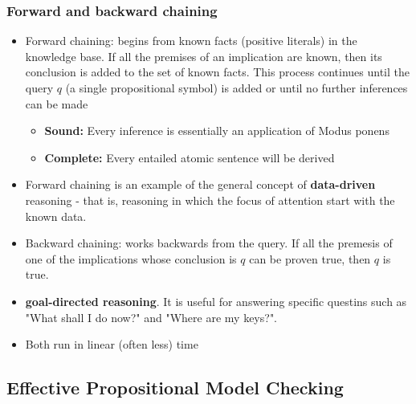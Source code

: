 \documentclass{scrartcl}
\begin{document}
\subsubsection{Forward and backward chaining}
\begin{itemize}
    \item
        Forward chaining: begins from known facts (positive literals) in the knowledge base. If all the premises of an implication are known, then its conclusion is added to the set of known facts. This process continues until the query $q$ (a single propositional symbol) is added or until no further inferences can be made
    \begin{itemize}
        \item
            \textbf{Sound:} Every inference is essentially an application of Modus ponens
        \item
            \textbf{Complete:} Every entailed atomic sentence will be derived
    \end{itemize}
    
    \item
        Forward chaining is an example of the general concept of \textbf{data-driven} reasoning - that is, reasoning in which the focus of attention start with the known data.
    \item
        Backward chaining: works backwards from the query. If all the premesis of one of the implications whose conclusion is $q$ can be proven true, then $q$ is true.
    \item
        \textbf{goal-directed reasoning}. It is useful for answering specific questins such as "What shall I do now?" and "Where are my keys?".
    \item
        Both run in linear (often less) time
\end{itemize}

\subsection{Effective Propositional Model Checking}
\end{document}
